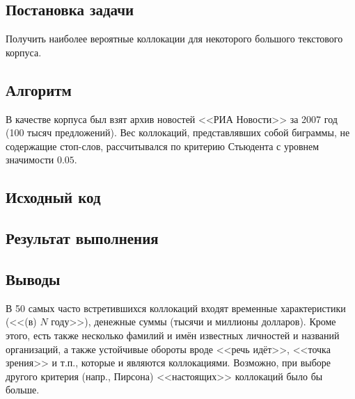 \documentclass[a4paper, 12pt]{article}
\begin{document}

\newpage


\subsection*{Постановка задачи}
Получить наиболее вероятные коллокации для некоторого большого текстового корпуса.

\subsection*{Алгоритм}
В качестве корпуса был взят архив новостей <<РИА Новости>> за 2007 год (100 тысяч предложений). Вес коллокаций, представлявших собой биграммы, не содержащие стоп-слов, рассчитывался по критерию Стьюдента с уровнем значимости $0.05$.

\subsection*{Исходный код}


\subsection*{Результат выполнения}


\subsection*{Выводы}
В 50 самых часто встретившихся коллокаций входят временные характеристики (<<(в) $N$ году>>), денежные суммы (тысячи и миллионы долларов). Кроме этого, есть также несколько фамилий и имён известных личностей и названий организаций, а также устойчивые обороты вроде <<речь идёт>>, <<точка зрения>> и т.п., которые и являются коллокациями. Возможно, при выборе другого критерия (напр., Пирсона) <<настоящих>> коллокаций было бы больше.
\end{document}
